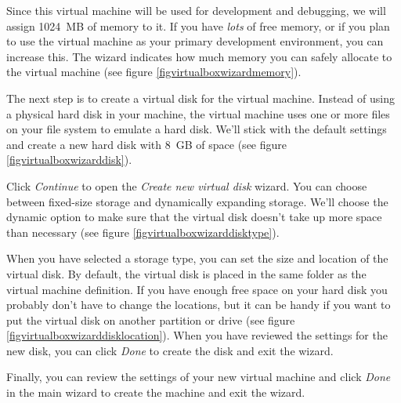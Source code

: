 \documentclass[draft,ebook,10pt,twoside,openright]{memoir}
\begin{document}
Since this virtual machine will be used for development and debugging, we will assign 1024~MB of memory to it. If you have \emph{lots} of free memory, or if you plan to use the virtual machine as your primary development environment, you can increase this. The wizard indicates how much memory you can safely allocate to the virtual machine (see figure \ref{figvirtualboxwizardmemory}).


The next step is to create a virtual disk for the virtual machine. Instead of using a physical hard disk in your machine, the virtual machine uses one or more files on your file system to emulate a hard disk. We'll stick with the default settings and create a new hard disk with 8~GB of space (see figure \ref{figvirtualboxwizarddisk}).


Click \emph{Continue} to open the \emph{Create new virtual disk} wizard. You can choose between fixed-size storage and dynamically expanding storage. We'll choose the dynamic option to make sure that the virtual disk doesn't take up more space than necessary (see figure \ref{figvirtualboxwizarddisktype}).


When you have selected a storage type, you can set the size and location of the virtual disk. By default, the virtual disk is placed in the same folder as the virtual machine definition. If you have enough free space on your hard disk you probably don't have to change the locations, but it can be handy if you want to put the virtual disk on another partition or drive (see figure \ref{figvirtualboxwizarddisklocation}). When you have reviewed the settings for the new disk, you can click \emph{Done} to create the disk and exit the wizard.


Finally, you can review the settings of your new virtual machine and click \emph{Done} in the main wizard to create the machine and exit the wizard.
\end{document}
